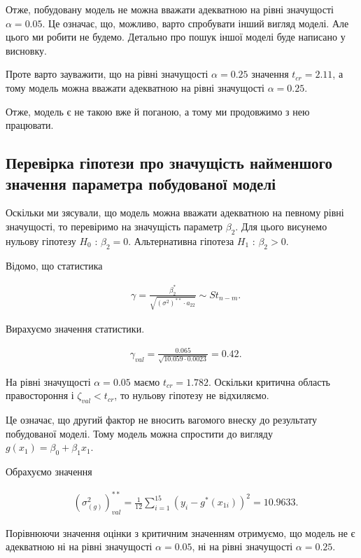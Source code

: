 \documentclass[14pt,a4paper]{scrartcl}
\theoremstyle{definition}
\theoremstyle{remark}
\theoremstyle{definition}
\theoremstyle{definition}
\begin{document}
Отже, побудовану модель не можна вважати адекватною на рівні значущості $\alpha = 0.05$. Це означає, що, можливо, варто спробувати інший вигляд моделі. Але цього ми робити не будемо. Детально про пошук іншої моделі буде написано у висновку.

Проте варто зауважити, що на рівні значущості $\alpha = 0.25$ значення $t_{cr} = 2.11$, а тому модель можна вважати адекватною на рівні значущості $\alpha = 0.25$.

Отже, модель є не такою вже й поганою, а тому ми продовжимо з нею працювати.

\subsection{Перевірка гіпотези про значущість найменшого значення параметра побудованої моделі}

Оскільки ми з\textquotesingle ясували, що модель можна вважати адекватною на певному рівні значущості, то перевіримо на значущість параметр $\beta_{2}$. Для цього висунемо нульову гіпотезу $H_{0}$ : $\beta_{2} = 0$. Альтернативна гіпотеза $H_{1}$ : $\beta_{2} > 0$.

Відомо, що статистика

\begin{align*}
  & \gamma = \frac{\beta_{2}^{*}}{\sqrt{(\sigma^2)^{**}\cdot a_{22}}} \sim St_{n - m}.
\end{align*}

Вирахуємо значення статистики.

\begin{align*}
  & \gamma_{val} = \frac{0.065}{\sqrt{10.059 \cdot 0.0023}} = 0.42.
\end{align*}

На рівні значущості $\alpha = 0.05$ маємо $t_{cr} = 1.782$. Оскільки критична область правостороння і $\zeta_{val} < t_{cr}$, то нульову гіпотезу не відхиляємо.

Це означає, що другий фактор не вносить вагомого внеску до результату побудованої моделі. Тому модель можна спростити до вигляду $g(x_{1}) = \beta_{0} + \beta_{1} x_{1}$.

Обрахуємо значення

\begin{align*}
  & (\sigma_{(g)}^2)^{**}_{val} = \frac{1}{12} \sum_{i = 1}^{15} (y_{i} - g^{*}(x_{1i}))^2 = 10.9633.
\end{align*}

Порівнюючи значення оцінки з критичним значенням отримуємо, що модель не є адекватною ні на рівні значущості $\alpha = 0.05$, ні на рівні значущості $\alpha = 0.25$.
\end{document}
